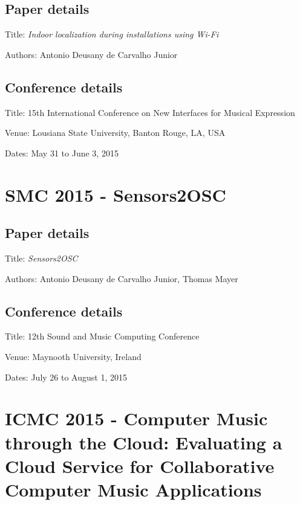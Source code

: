 \subsection*{Paper details}

Title: \textit{Indoor localization during installations using Wi-Fi}

Authors: Antonio Deusany de Carvalho Junior

\subsection*{Conference details}

Title: 15th International Conference on New Interfaces for Musical Expression

Venue: Lousiana State University, Banton Rouge, LA, USA

Dates: May 31 to June 3, 2015



\section{SMC 2015 - Sensors2OSC}
\label{ape:papersmc2015}

\subsection*{Paper details}

Title: \textit{Sensors2OSC}

Authors: Antonio Deusany de Carvalho Junior, Thomas Mayer

\subsection*{Conference details}

Title: 12th Sound and Music Computing Conference

Venue: Maynooth University, Ireland

Dates: July 26 to August 1, 2015




\section{ICMC 2015 - Computer Music through the Cloud: Evaluating a Cloud Service for Collaborative Computer Music Applications}
\label{ape:papericmc2015}

